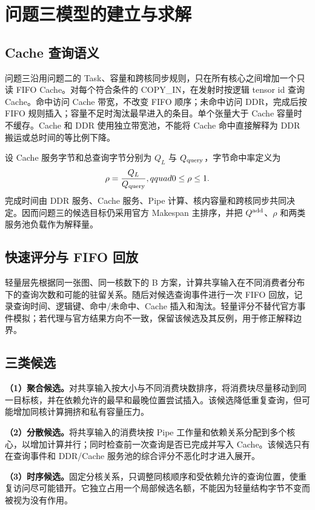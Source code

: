 \section{问题三模型的建立与求解}
\subsection{Cache 查询语义}
问题三沿用问题二的 Task、容量和跨核同步规则，只在所有核心之间增加一个只读 FIFO Cache。对每个符合条件的 COPY\_IN，在发射时按逻辑 tensor id 查询 Cache。命中访问 Cache 带宽，不改变 FIFO 顺序；未命中访问 DDR，完成后按 FIFO 规则插入；容量不足时淘汰最早进入的条目。单个张量大于 Cache 容量时不缓存。Cache 和 DDR 使用独立带宽池，不能将 Cache 命中直接解释为 DDR 搬运或总时间的等比例下降。

设 Cache 服务字节和总查询字节分别为 $Q_L$ 与 $Q_{\rm query}$，字节命中率定义为
\begin{equation}
\rho=\frac{Q_L}{Q_{\rm query}},qquad 0\le\rho\le1.
\end{equation}
完成时间由 DDR 服务、Cache 服务、Pipe 计算、核内容量和跨核同步共同决定。因而问题三的候选目标仍采用官方 Makespan 主排序，并把 $Q^{\rm add}$、$\rho$ 和两类服务池负载作为解释量。

\subsection{快速评分与 FIFO 回放}
轻量层先根据同一张图、同一核数下的 B 方案，计算共享输入在不同消费者分布下的查询次数和可能的驻留关系。随后对候选查询事件进行一次 FIFO 回放，记录查询时间、逻辑键、命中/未命中、Cache 插入和淘汰。轻量评分不替代官方事件模拟；若代理与官方结果方向不一致，保留该候选及其反例，用于修正解释边界。

\subsection{三类候选}
\textbf{（1）聚合候选。}对共享输入按大小与不同消费块数排序，将消费块尽量移动到同一目标核，并在依赖允许的最早和最晚位置尝试插入。该候选降低重复查询，但可能增加同核计算拥挤和私有容量压力。

\textbf{（2）分散候选。}将共享输入的消费块按 Pipe 工作量和依赖关系分配到多个核心，以增加计算并行；同时检查前一次查询是否已完成并写入 Cache。该候选只有在查询事件和 DDR/Cache 服务池的综合评分不恶化时才进入展开。

\textbf{（3）时序候选。}固定分核关系，只调整同核顺序和受依赖允许的查询位置，使重复访问尽可能错开。它独立占用一个局部候选名额，不能因为轻量结构字节不变而被视为没有作用。

